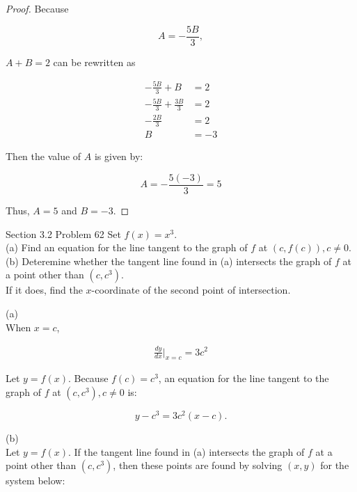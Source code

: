 \documentclass{article}
\begin{document}
\begin{proof}
        Because

        \[
            A = - \frac{5B}{3},
        \]

        $A+B=2$ can be rewritten as

        \begin{align*}
            - \frac{5B}{3} + B &= 2 \\
            - \frac{5B}{3} + \frac{3B}{3} &= 2 \\
            -\frac{2B}{3}                 &= 2 \\
            B                             &= -3
        \end{align*}

        Then the value of $A$ is given by:

        \[
            A = -\frac{5(-3)}{3} = 5
        \]

        Thus, $A = 5$ and $B=-3$.
    \end{proof}



    \begin{tbhtheorem}{Section 3.2 Problem 62}
        Set $f(x) = x^3$. \\
        (a) Find an equation for the line tangent to the graph of $f$ at $(c, f(c)), c\not = 0$. \\
        (b) Deteremine whether the tangent line found in (a) intersects the graph of $f$ at a point other than $(c,c^3)$. \\
        If it does, find the $x$-coordinate of the second point of intersection.
    \end{tbhtheorem}

    (a) \\
    When $x=c$,

    \begin{align*}
        \frac{dy}{dx}\Big|_{x=c} = 3c^2
    \end{align*}

    Let $y=f(x)$. Because $f(c)=c^3$, an equation for the line tangent to the graph of $f$ at $(c,c^3),c\not = 0$ is:

    \[
        y-c^3 = 3c^2 (x-c).
    \]

    \pagebreak
    \thispagestyle{page5}

    (b) \\
    Let $y=f(x)$. If the tangent line found in (a) intersects the graph of $f$ at a point other than $(c,c^3)$, then these points are found by solving $(x,y)$ for the system below:
\end{document}
